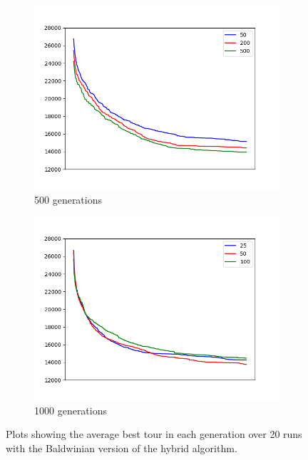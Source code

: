 \documentclass[a4paper]{article}
\begin{document}
\begin{figure}[h]
  \centering
  \begin{subfigure}[b]{0.48\textwidth}
    \includegraphics[width=\textwidth]{run_hybrid_baldwinian_20_runs_500_gens.png}
    \caption{500 generations}
  \end{subfigure}
  \hfill
  \begin{subfigure}[b]{0.48\textwidth}
    \includegraphics[width=\textwidth]{run_hybrid_baldwinian_20_runs_1000_gens.png}
    \caption{1000 generations}
  \end{subfigure}
  \caption{Plots showing the average best tour in each generation over 20 runs
    with the Baldwinian version of the hybrid algorithm.}
  \label{fig:hb}
\end{figure}
\end{document}
